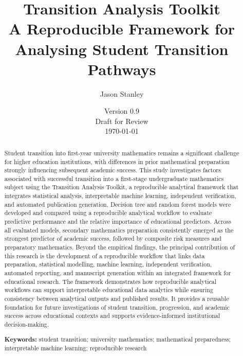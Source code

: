 \documentclass[11pt]{article}
\title{Transition Analysis Toolkit\\
A Reproducible Framework for Analysing Student Transition Pathways}
\author{Jason Stanley}
\date{
Version 0.9\\[0.5em]
Draft for Review\\[1em]
\today
}
\begin{document}
\maketitle

\setlength{\parskip}{0.4em}
\linespread{1.10}\selectfont

\begin{abstract}

Student transition into first-year university mathematics remains a significant challenge for higher education institutions, with differences in prior mathematical 
preparation strongly influencing subsequent academic success. This study investigates factors associated with successful transition into a first-stage undergraduate 
mathematics subject using the Transition Analysis Toolkit, a reproducible analytical framework that integrates statistical analysis, interpretable machine learning, 
independent verification, and automated publication generation. Decision tree and random forest models were developed and compared using a reproducible analytical 
workflow to evaluate predictive performance and the relative importance of educational predictors. Across all evaluated models, secondary mathematics preparation 
consistently emerged as the strongest predictor of academic success, followed by composite risk measures and preparatory mathematics. Beyond the empirical findings, 
the principal contribution of this research is the development of a reproducible workflow that links data preparation, statistical 
modelling, machine learning, independent verification, automated reporting, and manuscript generation within an integrated framework for educational research. 
The framework demonstrates how reproducible analytical workflows can support interpretable educational data analytics while ensuring consistency between analytical 
outputs and published results. It provides a reusable foundation for future investigations of student transition, progression, and academic success across 
educational contexts and supports evidence-informed institutional decision-making.



\vspace{1.75em}

\noindent\small\textbf{Keywords:}
student transition; university mathematics; mathematical preparedness;
interpretable machine learning; reproducible research

\end{abstract}

\end{document}
